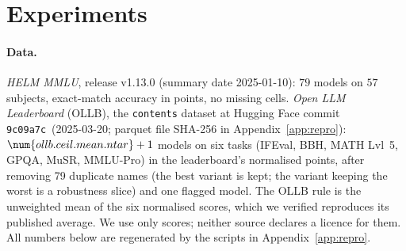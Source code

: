\section{Experiments}\label{sec:experiments}
\paragraph{Data.}
\emph{HELM MMLU}, release v1.13.0 (summary date 2025-01-10): $79$ models on $57$ subjects, exact-match accuracy in points, no missing cells. \emph{Open LLM Leaderboard} (OLLB), the \texttt{contents} dataset at Hugging Face commit \texttt{9c09a7c}\ (2025-03-20; parquet file SHA-256 in Appendix~\ref{app:repro}): $\num{ollb.ceil.mean.ntar}+1$ models on six tasks (IFEval, BBH, MATH Lvl~5, GPQA, MuSR, MMLU-Pro) in the leaderboard's normalised points, after removing 79 duplicate names (the best variant is kept; the variant keeping the worst is a robustness slice) and one flagged model. The OLLB rule is the unweighted mean of the six normalised scores, which we verified reproduces its published average. We use only scores; neither source declares a licence for them. All numbers below are regenerated by the scripts in Appendix~\ref{app:repro}.

